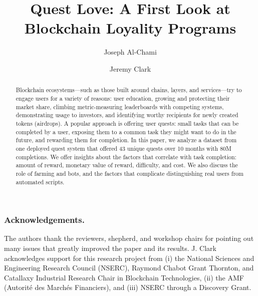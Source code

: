 \documentclass[runningheads]{llncs}
\begin{document}
\title{Quest Love: A First Look at Blockchain Loyality Programs}

\author{
	Joseph Al-Chami \and 
	Jeremy Clark
	}

	
	

\maketitle



\begin{abstract}

Blockchain ecosystems---such as those built around chains, layers, and services---try to engage users for a variety of reasons: user education, growing and protecting their market share, climbing metric-measuring leaderboards with competing systems, demonstrating usage to investors, and identifying worthy recipients for newly created tokens (airdrops). A popular approach is offering user quests: small tasks that can be completed by a user, exposing them to a common task they might want to do in the future, and rewarding them for completion. In this paper, we analyze a dataset from one deployed quest system that offered 43 unique quests over 10 months with 80M completions. We offer insights about the factors that correlate with task completion: amount of reward, monetary value of reward, difficulty, and cost. We also discuss the role of farming and bots, and the factors that complicate distinguishing real users from automated scripts.

\end{abstract}






\subsubsection*{Acknowledgements.} 

The authors thank the reviewers, shepherd, and workshop chairs for pointing out many issues that greatly improved the paper and its results. J. Clark acknowledges support for this research project from (i) the National Sciences and Engineering Research Council (NSERC), Raymond Chabot Grant Thornton, and Catallaxy Industrial Research Chair in Blockchain Technologies, (ii) the AMF (Autorité des Marchés Financiers), and (iii) NSERC through a Discovery Grant. 



\nocite{*}


\clearpage
\appendix
\end{document}
